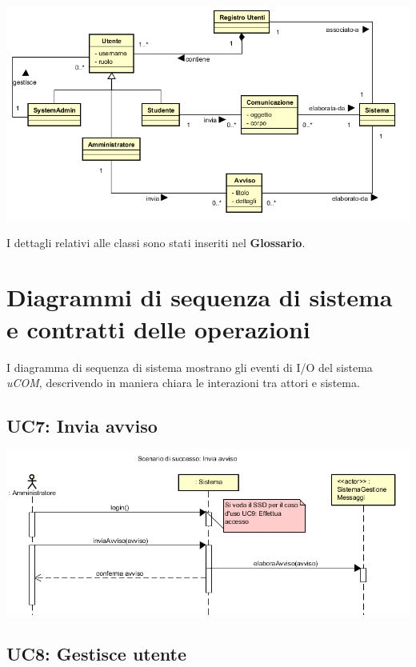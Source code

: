 \documentclass[12pt]{report}
\begin{document}
	\begin{center}	
	\includegraphics{./images/domain-I2.png}
	\end{center}
	
	I dettagli relativi alle classi sono stati inseriti nel \textbf{Glossario}.
	
	\newpage
	
	\section{Diagrammi di sequenza di sistema e contratti delle operazioni}
	
	I diagramma di sequenza di sistema mostrano gli eventi di I/O del sistema \textit{uCOM}, descrivendo in maniera chiara le interazioni tra attori e sistema.
	
	\subsection{UC7: Invia avviso}
	\begin{center}
		\includegraphics{./images/SSD_UC7.png}
	\end{center}
	
	\newpage	
		
	\subsection{UC8: Gestisce utente}
	
\end{document}
